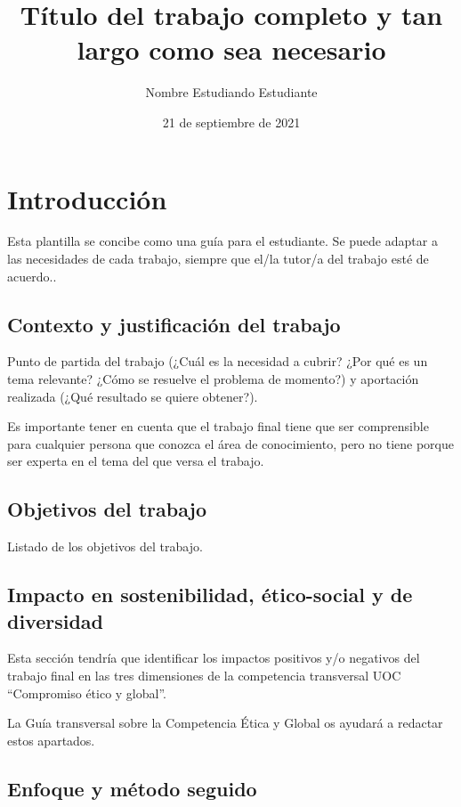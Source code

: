 \documentclass[IB,BIB]{TFUOC}%
\title{Título del trabajo completo y tan largo como sea necesario}
\author{Nombre Estudiando Estudiante}
\date{21 de septiembre de 2021}
\begin{document}
\estructura

\tableofcontents

\listoffigures

\listoftables




\chapter{Introducción}

Esta plantilla se concibe como una guía para el estudiante. Se puede adaptar a las necesidades de cada trabajo, siempre que el/la tutor/a del trabajo esté de acuerdo..

\section{Contexto y justificación del trabajo}


Punto de partida del trabajo (¿Cuál es la necesidad a cubrir? ¿Por qué es un tema relevante? ¿Cómo se resuelve el problema de momento?) y aportación realizada (¿Qué resultado se quiere obtener?).

Es importante tener en cuenta que el trabajo final tiene que ser comprensible para cualquier persona que conozca el área de conocimiento, pero no tiene porque ser experta en el tema del que versa el trabajo.

\section{Objetivos del trabajo}

Listado de los objetivos del trabajo.

\section{Impacto en sostenibilidad, ético-social y de diversidad}
\label{s:etic}

Esta sección tendría que identificar los impactos positivos y/o negativos del trabajo final en las tres dimensiones de la competencia transversal UOC “Compromiso ético y global”.
 
La Guía transversal sobre la Competencia Ética y Global os ayudará a redactar estos apartados.


\section{Enfoque y método seguido}
\end{document}
